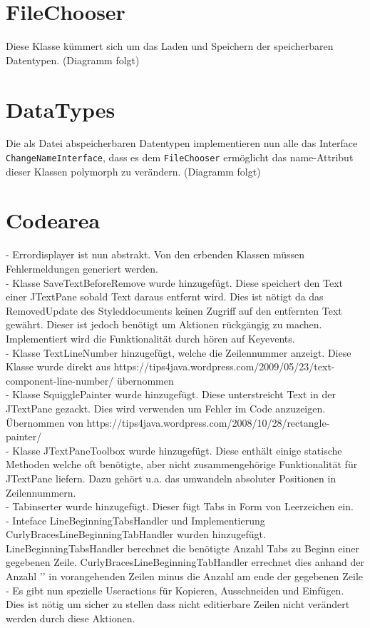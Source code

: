 \documentclass[a4paper]{scrreprt}
\begin{document}
\section{FileChooser}
Diese Klasse kümmert sich um das Laden und Speichern der speicherbaren Datentypen.
\newline
(Diagramm folgt)
\newline

\section{DataTypes}
Die als Datei abspeicherbaren Datentypen implementieren nun alle das Interface \verb!ChangeNameInterface!, dass es dem \verb!FileChooser! ermöglicht das name-Attribut dieser Klassen polymorph zu verändern.
\newline
(Diagramm folgt)
\newline


\section{Codearea}
- Errordisplayer ist nun abstrakt. Von den erbenden Klassen müssen Fehlermeldungen generiert werden.\\
- Klasse SaveTextBeforeRemove wurde hinzugefügt. Diese speichert den Text einer JTextPane sobald Text daraus entfernt wird. Dies ist nötigt da das RemovedUpdate des Styleddocuments keinen Zugriff auf den entfernten Text gewährt. Dieser ist jedoch benötigt um Aktionen rückgängig zu machen. Implementiert wird die Funktionalität durch hören auf Keyevents.\\
- Klasse TextLineNumber hinzugefügt, welche die Zeilennummer anzeigt. Diese Klasse wurde direkt aus https://tips4java.wordpress.com/2009/05/23/text-component-line-number/ übernommen\\
- Klasse SquigglePainter wurde hinzugefügt. Diese unterstreicht Text in der JTextPane gezackt. Dies wird verwenden um Fehler im Code anzuzeigen. Übernommen von 
https://tips4java.wordpress.com/2008/10/28/rectangle-painter/\\
- Klasse JTextPaneToolbox wurde hinzugefügt. Diese enthält einige statische Methoden welche oft benötigte, aber nicht zusammengehörige Funktionalität für JTextPane liefern. Dazu gehört u.a. das umwandeln absoluter Positionen in Zeilennummern.\\
- Tabinserter wurde hinzugefügt. Dieser fügt Tabs in Form von Leerzeichen ein.\\
- Inteface LineBeginningTabsHandler und Implementierung CurlyBracesLineBeginningTabHandler wurden hinzugefügt. LineBeginningTabsHandler berechnet die benötigte Anzahl Tabs zu Beginn einer gegebenen Zeile. CurlyBracesLineBeginningTabHandler errechnet dies anhand der Anzahl '{' in vorangehenden Zeilen minus die Anzahl } am ende der gegebenen Zeile\\
- Es gibt nun spezielle Useractions für Kopieren, Ausschneiden und Einfügen. Dies ist nötig um sicher zu stellen dass nicht editierbare Zeilen nicht verändert werden durch diese Aktionen.
\end{document}
